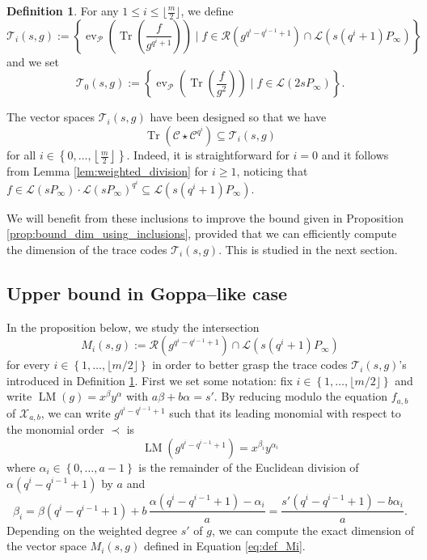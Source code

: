 \documentclass[lettersize,journal]{IEEEtran}
\theoremstyle{plain}
\theoremstyle{definition}
\newtheorem{definition}[thm]{Definition}
\theoremstyle{remark}
\DeclareMathOperator{\ev}{ev}
\DeclareMathOperator{\trace}{Tr}
\newcommand{\calP}{\mathcal{P}}
\newcommand{\calL}{\mathcal{L}}
\newcommand{\calC}{\mathcal{C}}
\newcommand{\calR}{\mathcal{R}}
\newcommand{\calT}{\mathcal{T}}
\newcommand{\calX}{\mathcal{X}}
\newcommand{\Tr}[1]{\trace\!\left(#1\right)}
\newcommand{\set}[1]{\left\{#1\right\}}
\newcommand{\LM}[1]{\operatorname{LM}\left(#1\right)}
\begin{document}
	\begin{definition} \label{def:T_i's}
		For any $1 \leq i \leq \lfloor\frac{m}{2}\rfloor$, we define
		$$\calT_i(s,g):=\set{\ev_{\calP}\left(\Tr{\frac{f}{g^{q^i+1}}}\right) \mid f \in \calR\left(g^{q^i-q^{i-1}+1}\right)  \cap \calL(s(q^i+1)P_\infty)}$$
		and we set $$\calT_0(s,g) := \set{\ev_{\calP}\left(\Tr{\frac{f}{g^{2}}}\right) \mid f \in \calL(2sP_\infty)}.$$
	\end{definition}
	
	The vector spaces $\calT_i(s,g)$ have been designed so that we have
	\begin{equation} \label{eq:Tr(C*C^q^i)_dans_T_i} 
		\Tr{\calC \star \calC^{q^i}} \subseteq \calT_i(s,g)
	\end{equation}
	for all $i \in \set{0,\dots,\left\lfloor \frac{m}{2} \right\rfloor}$. Indeed, it is straightforward for $i=0$ and it follows from Lemma \ref{lem:weighted_division} for $i \geq 1$, noticing that $f \in \calL(sP_\infty) \cdot \calL(sP_\infty)^{q^i} \subseteq \calL(s(q^i+1)P_\infty)$. 
	
	We will benefit from these inclusions to improve the bound given in Proposition \ref{prop:bound_dim_using_inclusions}, provided that we can efficiently compute the dimension of the trace codes $\calT_i(s,g)$. This is studied in the next section.
	
	\subsection{Upper bound in Goppa--like case} \label{subsection : Upper_bound_Goppa-like}
	In the proposition below, we study the intersection 
	\begin{equation}\label{eq:def_Mi}
		M_i(s,g):=   \calR\left(g^{q^{i}-q^{i-1}+1}\right) \cap \calL(s(q^i+1)P_\infty)
	\end{equation}
	for every $i \in \set{1,\dots,\lfloor m/2 \rfloor}$ in order to better grasp the trace codes $\calT_i(s,g)$'s introduced in Definition \ref{def:T_i's}.
	First we set some notation: fix $i \in \set{1,\dots,\lfloor m/2 \rfloor}$ and write $\LM{g}=x^\beta y^\alpha$ with $a\beta + b\alpha=s'$. By reducing modulo the equation $f_{a,b}$ of $\calX_{a,b}$, we can write $g^{q^i-q^{i-1}+1}$ such that its leading monomial with respect to the monomial order $\prec$ is
	\begin{equation}\label{eq:gi}
		\LM{g^{q^i-q^{i-1}+1}}=x^{\beta_i} y^{\alpha_i}
	\end{equation}
	where $\alpha_i \in \set{0,\dots,a-1}$ is the remainder of the Euclidean division of $\alpha (q^i-q^{i-1}+1)$ by $a$ and 
	\begin{equation}\label{eq:value_beta_prime}
		\beta_i=\beta(q^i-q^{i-1}+1) + b \, \frac{\alpha(q^i-q^{i-1}+1)-\alpha_i}{a}= \frac{s'(q^i-q^{i-1}+1)-b\alpha_i}{a}.
	\end{equation}
	Depending on the weighted degree $s'$ of $g$, we can compute the exact dimension of the vector space $M_i(s,g)$ defined in Equation \eqref{eq:def_Mi}.
	
\end{document}
